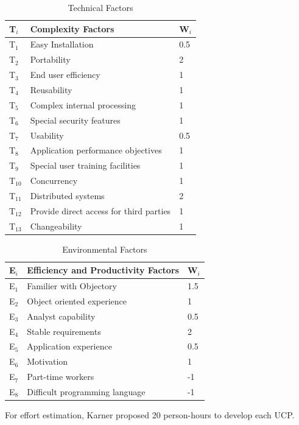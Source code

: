 \documentclass[8pt,twocolumn]{article}
\begin{document}
\begin{table}[h]
\small
\caption{Technical Factors}
\vspace{0.5cm}
\label{table2}
\begin{tabular}{|p{1.75cm}|p{5cm}|p{1cm}|}
\hline
\textbf{T$_i$} & \textbf{Complexity Factors} & \textbf{W$_i$}\\
\hline
T$_1$ & Easy Installation & 0.5\\
\hline
T$_2$ & Portability & 2\\
\hline
T$_3$ & End user efficiency & 1\\
\hline
T$_4$ & Reusability & 1\\
\hline
T$_5$ & Complex internal processing & 1\\
\hline
T$_6$ & Special security features & 1\\
\hline
T$_7$ & Usability & 0.5\\
\hline
T$_8$ & Application performance objectives & 1\\
\hline
T$_9$ & Special user training facilities & 1\\
\hline
T$_{10}$ & Concurrency & 1\\
\hline
T$_{11}$ & Distributed systems & 2\\
\hline
T$_{12}$ & Provide direct access for third parties & 1\\
\hline
T$_{13}$ & Changeability & 1\\
\hline
\end{tabular}
\end{table}
\vspace{0.5cm}
\begin{table}[h]
\small
\caption{Environmental Factors}
\vspace{.5cm}
\label{table3}
\begin{tabular}{|p{1cm}|p{5cm}|p{1cm}|}
\hline
\textbf{E$_i$} & \textbf{Efficiency and Productivity Factors} & \textbf{W$_i$}\\
\hline
E$_1$ & Familier with Objectory & 1.5\\
\hline
E$_2$ & Object oriented experience & 1\\
\hline
E$_3$ & Analyst capability & 0.5\\
\hline
E$_4$ & Stable requirements & 2\\
\hline
E$_5$ & Application experience & 0.5\\
\hline
E$_6$ & Motivation & 1\\
\hline
E$_7$ & Part-time workers & -1\\
\hline
E$_8$ & Difficult programming language & -1\\
\hline
\end{tabular}
\end{table}
For effort estimation, Karner proposed 20 person-hours to develop each UCP.
\end{document}
